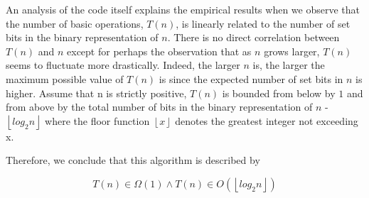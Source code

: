\documentclass[12pt]{article}
\begin{document}
An analysis of the code itself explains the empirical results when we
observe that the number of basic operations, $T(n)$, is linearly related to 
the number of set bits in the binary representation of $n$. There is no 
direct correlation between $T(n)$ and $n$ except for perhaps the observation
that as $n$ grows larger, $T(n)$ seems to fluctuate more drastically. Indeed, 
the larger $n$ is, the larger the maximum possible value of $T(n)$ is since 
the expected number of set bits in $n$ is higher. Assume that n is strictly 
positive, $T(n)$ is bounded from below by $1$ and from above by the total 
number of bits in the binary representation of $n$ - 
$\left \lfloor {log_2n} \right \rfloor$ where the floor function 
$\left \lfloor {x} \right \rfloor$ denotes the greatest integer not exceeding x.

Therefore, we conclude that this algorithm is described by

\[
T(n) \in \Omega( 1 ) \land T(n) \in O(\left \lfloor {log_2n} \right \rfloor)
\]
\end{document}
